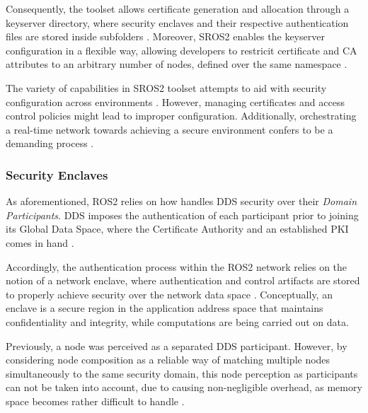 Consequently, the toolset allows certificate generation and allocation through a keyserver directory, where security enclaves and their respective authentication files are stored inside subfolders \cite{white2016sros, ros-dds-integration}. Moreover, SROS2 enables the keyserver configuration in a flexible way, allowing developers to restricit certificate and CA attributes to an arbitrary number of nodes, defined over the same namespace \cite{white2016sros}.

The variety of capabilities in SROS2 toolset attempts to aid with security configuration across environments \cite{ros-dds-integration}. However, managing certificates and access control policies might lead to improper configuration. Additionally, orchestrating a real-time network towards achieving a secure environment confers to be a demanding process \cite{ros-dds-integration, white2019network}.


\subsubsection{Security Enclaves}

As aforementioned, ROS2 relies on how handles DDS security over their \textit{Domain Participants}. DDS imposes the authentication of each participant prior to joining its Global Data Space, where the Certificate Authority and an established PKI comes in hand \cite{white2019network, white2016sros}.

Accordingly, the authentication process within the ROS2 network relies on the notion of a network enclave, where authentication and control artifacts are stored to properly achieve security over the network data space \cite{ros-security-enclaves}. Conceptually, an enclave is a secure region in the application address space that maintains confidentiality and integrity, while computations are being carried out on data.

Previously, a node was perceived as a separated DDS participant. However, by considering node composition as a reliable way of matching multiple nodes simultaneously to the same security domain, this node perception as participants can not be taken into account, due to causing non-negligible overhead, as memory space becomes rather difficult to handle \cite{ros-security-enclaves, ros-access-control}.


